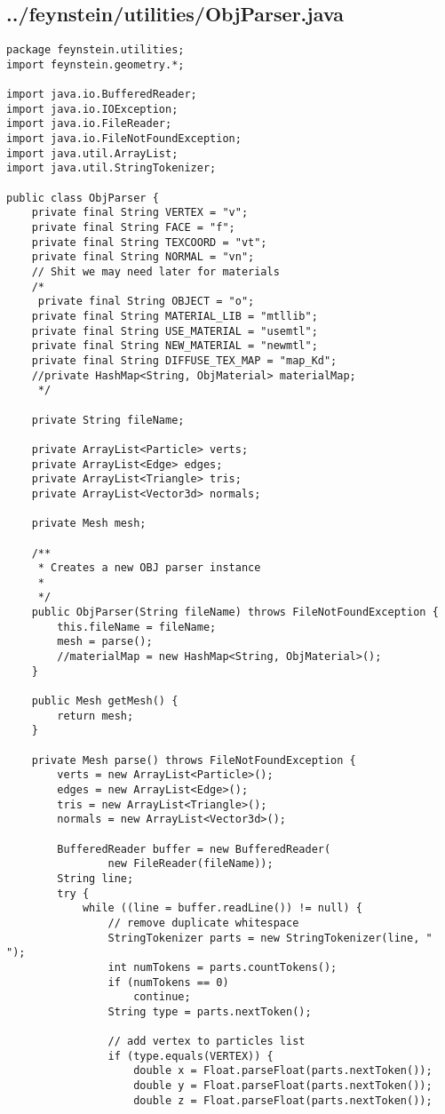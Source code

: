 \subsection*{../feynstein/utilities/ObjParser.java}
\begin{lstlisting}
package feynstein.utilities;
import feynstein.geometry.*;

import java.io.BufferedReader;
import java.io.IOException;
import java.io.FileReader;
import java.io.FileNotFoundException;
import java.util.ArrayList;
import java.util.StringTokenizer;

public class ObjParser {
	private final String VERTEX = "v";
	private final String FACE = "f";
	private final String TEXCOORD = "vt";
	private final String NORMAL = "vn";
	// Shit we may need later for materials
	/*
	 private final String OBJECT = "o";
	private final String MATERIAL_LIB = "mtllib";
	private final String USE_MATERIAL = "usemtl";
	private final String NEW_MATERIAL = "newmtl";
	private final String DIFFUSE_TEX_MAP = "map_Kd";
	//private HashMap<String, ObjMaterial> materialMap;
	 */
	
	private String fileName;

	private ArrayList<Particle> verts;
	private ArrayList<Edge> edges;
	private ArrayList<Triangle> tris;
	private ArrayList<Vector3d> normals;
	
	private Mesh mesh;
	
	/**
	 * Creates a new OBJ parser instance
	 * 
	 */
	public ObjParser(String fileName) throws FileNotFoundException {
		this.fileName = fileName;
		mesh = parse();
		//materialMap = new HashMap<String, ObjMaterial>();
	}

	public Mesh getMesh() {
		return mesh;
	}
	
	private Mesh parse() throws FileNotFoundException {
		verts = new ArrayList<Particle>();
		edges = new ArrayList<Edge>();
		tris = new ArrayList<Triangle>();
		normals = new ArrayList<Vector3d>();
		
		BufferedReader buffer = new BufferedReader(
				new FileReader(fileName));
		String line;
		try {
			while ((line = buffer.readLine()) != null) {
				// remove duplicate whitespace
				StringTokenizer parts = new StringTokenizer(line, " ");
				int numTokens = parts.countTokens();
				if (numTokens == 0)
					continue;
				String type = parts.nextToken();

				// add vertex to particles list
				if (type.equals(VERTEX)) {
					double x = Float.parseFloat(parts.nextToken());
					double y = Float.parseFloat(parts.nextToken());
					double z = Float.parseFloat(parts.nextToken());
					

\end{lstlisting}
